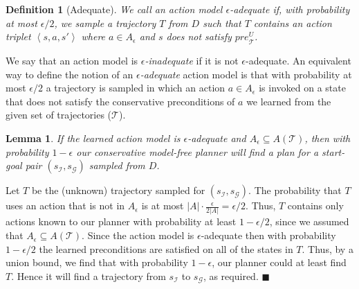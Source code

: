 \documentclass{article}
\newtheorem{definition}{Definition}
\newtheorem{lemma}{Lemma}
\newenvironment{proof}{\noindent{\bf Proof:~~}}{\qed}
\newcommand{\tuple}[1]{\ensuremath{\left \langle #1 \right \rangle }}
\newcommand{\qed}{\hfill\ensuremath{\blacksquare}}
\newcommand{\pre}{\textit{pre}}
\begin{document}
		\begin{definition}[Adequate]
			We call an action model {\em $\epsilon$-adequate} if, with probability at most $\epsilon/2$, we sample a trajectory $T$ from $D$ such that $T$ contains an action triplet $\tuple{s,a,s'}$  where $a\in A_\epsilon$ and $s$ does not satisfy $\pre_\mathcal{T}^U$. 
			\label{def:adequate}
		\end{definition}
		We say that an action model is {\em $\epsilon$-inadequate} if it is not $\epsilon$-adequate. 
		An equivalent way to define the notion of an {\em $\epsilon$-adequate} action model is
		that with probability at most $\epsilon/2$ 
		a trajectory is sampled in which an action $a\in A_\epsilon$ is invoked on a state that 
		does not satisfy the conservative preconditions of $a$ we learned from the given set of trajectories ($\mathcal{T}$).  
		
		
		\begin{lemma}
			If the learned action model is $\epsilon$-adequate and $A_\epsilon\subseteq A(\mathcal{T})$, 
			then with probability $1-\epsilon$ our conservative model-free planner will find a plan for a start-goal pair $(s_\mathcal{I},s_\mathcal{G})$ sampled from $D$.
			\label{lem:plan-existance}
		\end{lemma}
		\begin{proof}
			Let $T$ be the (unknown) trajectory sampled for $(s_\mathcal{I},s_\mathcal{G})$. 
			The probability that $T$ uses an action that is not in 
			$A_\epsilon$ is at most $|A|\cdot\frac{\epsilon}{2|A|}=\epsilon/2$. 
			Thus, $T$ contains only actions known to our planner with probability at least $1-\epsilon/2$, since we assumed that $A_\epsilon\subseteq A(\mathcal{T})$. 
			Since the action model is $\epsilon$-adequate then with probability $1-\epsilon/2$ the learned preconditions are satisfied on all of the states in $T$. Thus, by a union bound, we find that with probability $1-\epsilon$, our planner could at least find $T$. Hence it will find a trajectory from $s_\mathcal{I}$ to $s_\mathcal{G}$, as required. 
		\end{proof}
		
\end{document}
